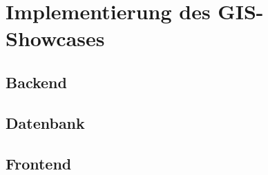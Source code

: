 \chapter{Implementierung des GIS-Showcases}
\section{Backend}
\section{Datenbank}
\section{Frontend}




